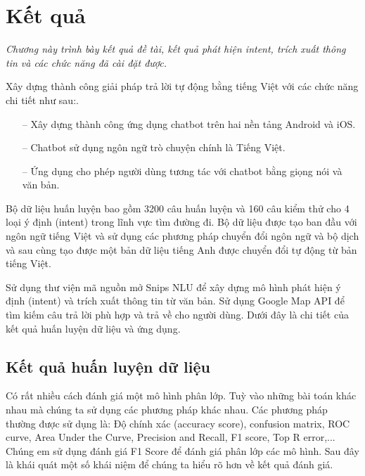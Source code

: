 \chapter{Kết quả}
\label{Chapter6}

\emph{Chương này trình bày kết quả đề tài, kết quả phát hiện intent, trích xuất thông tin và các chức năng đã cài đặt được.}


Xây dựng thành công giải pháp trả lời tự động bằng tiếng Việt với các chức năng chi tiết như sau:.
\begin{itemize}
    \item[--] Xây dựng thành công ứng dụng chatbot trên hai nền tảng Android và iOS.
    \item[--] Chatbot sử dụng ngôn ngữ trò chuyện chính là Tiếng Việt.
    \item[--] Ứng dụng cho phép người dùng tương tác với chatbot bằng giọng nói và văn bản.
\end{itemize}

Bộ dữ liệu huấn luyện bao gồm 3200 câu huấn luyện và 160 câu kiểm thử cho 4 loại ý định (intent) trong lĩnh vực tìm đường đi. Bộ dữ liệu được tạo ban đầu với ngôn ngữ tiếng Việt và sử dụng các phương pháp chuyển đổi ngôn ngữ và bộ dịch và sau cùng tạo được một bản dữ liệu tiếng Anh được chuyển đổi tự động từ bản tiếng Việt.  

Sử dụng thư viện mã nguồn mở Snips NLU\cite{Snipsnlu} để xây dựng mô hình phát hiện ý định (intent) và trích xuất thông tin từ văn bản. Sử dụng Google Map API\cite{ggmaps} để tìm kiếm câu trả lời phù hợp và trả về cho người dùng. Dưới đây là chi tiết của kết quả huấn luyện dữ liệu và ứng dụng.

\section{Kết quả huấn luyện dữ liệu}

Có rất nhiều cách đánh giá một mô hình phân lớp. Tuỳ vào những bài toán khác nhau mà chúng ta sử dụng các phương pháp khác nhau. Các phương pháp thường được sử dụng là: Độ chính xác (accuracy score), confusion matrix, ROC curve, Area Under the Curve, Precision and Recall, F1 score, Top R error,... Chúng em sử dụng đánh giá F1 Score để đánh giá phân lớp các mô hình. Sau đây là khái quát một số khái niệm để chúng ta hiểu rõ hơn về kết quả đánh giá.

